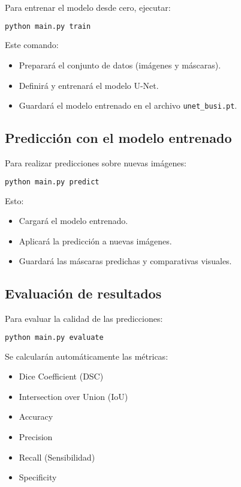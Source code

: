 \documentclass[12pt]{article}
\begin{document}
Para entrenar el modelo desde cero, ejecutar:

\begin{lstlisting}[language=bash]
python main.py train
\end{lstlisting}

Este comando:
\begin{itemize}
    \item Preparará el conjunto de datos (imágenes y máscaras).
    \item Definirá y entrenará el modelo U-Net.
    \item Guardará el modelo entrenado en el archivo \texttt{unet\_busi.pt}.
\end{itemize}

\subsection{Predicción con el modelo entrenado}

Para realizar predicciones sobre nuevas imágenes:

\begin{lstlisting}[language=bash]
python main.py predict
\end{lstlisting}

Esto:
\begin{itemize}
    \item Cargará el modelo entrenado.
    \item Aplicará la predicción a nuevas imágenes.
    \item Guardará las máscaras predichas y comparativas visuales.
\end{itemize}

\subsection{Evaluación de resultados}

Para evaluar la calidad de las predicciones:

\begin{lstlisting}[language=bash]
python main.py evaluate
\end{lstlisting}

Se calcularán automáticamente las métricas:
\begin{itemize}
    \item Dice Coefficient (DSC)
    \item Intersection over Union (IoU)
    \item Accuracy
    \item Precision
    \item Recall (Sensibilidad)
    \item Specificity
\end{itemize}
\end{document}
